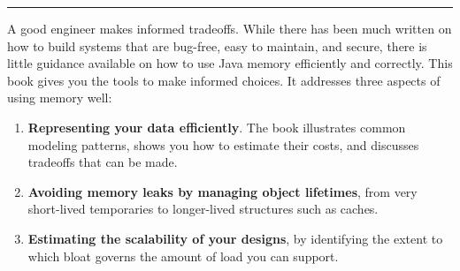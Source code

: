 \begin{comment}
While the book is a collection of advice on practical topics, it is also
organized so as to give a systematic approach to memory issues. When read as a
whole it can be helpful in seeing the range of topics that need to be
considered, especially early in design. That does not mean that one must read
the whole book in order, or do a comprehensive analysis of every data structure
in your design, in order to get the benefit. The chapters are written to stand
on their own where possible, so that if a particular pattern comes up in your
code you can quickly get some ideas on costs and alternatives. At the same time,
familiarizing yourself with a few concepts in the Introduction will make the
reading much easier.
\end{comment}





\begin{center}
    \rule[1ex]{.5\textwidth}{1.5pt}
\end{center}
  
A good engineer makes informed tradeoffs.  While there has been much written on
how to build systems that are bug-free, easy to maintain, and secure, there is
little guidance available on how to use Java memory efficiently and correctly.
This book gives you the tools to make informed choices. It
addresses three aspects of using memory well:
\begin{enumerate}
	\item \textbf{Representing your data efficiently}. The book illustrates
	common modeling patterns, shows you how to estimate their costs, and
	discusses tradeoffs that can be made.
	\item \textbf{Avoiding memory leaks by managing object lifetimes}, from very
	short-lived temporaries to longer-lived structures such as caches.
	\item \textbf{Estimating the scalability of your designs}, by identifying the
	extent to which bloat governs the amount of load you can support.
\end{enumerate}

